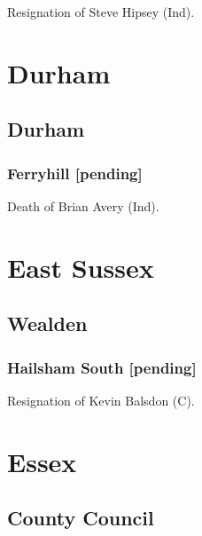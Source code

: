 \documentclass[a4paper,openany]{book}
\begin{document}
\begin{resultsiii}

Resignation of Steve Hipsey (Ind).

\section{Durham}

\subsection*{Durham}

\subsubsection*{Ferryhill \hspace*{\fill}\nolinebreak[1]%
	\enspace\hspace*{\fill}
	[pending]}


Death of Brian Avery (Ind).

\section{East Sussex}

\subsection*{Wealden}

\subsubsection*{Hailsham South \hspace*{\fill}\nolinebreak[1]%
	\enspace\hspace*{\fill}
	[pending]}


Resignation of Kevin Balsdon (C).

\section{Essex}

\subsection*{County Council}


\end{resultsiii}
\end{document}
